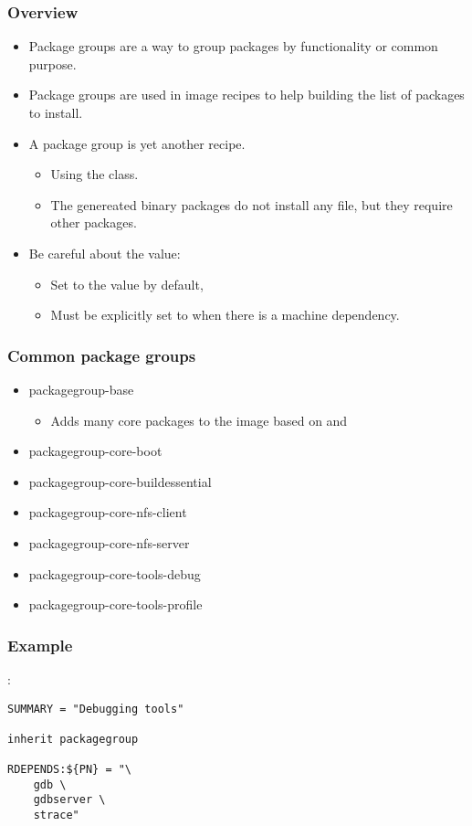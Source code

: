\begin{frame}
  \frametitle{Overview}
  \begin{itemize}
    \item Package groups are a way to group packages by functionality or
      common purpose.
    \item Package groups are used in image recipes to help building
      the list of packages to install.
    \item A package group is yet another recipe.
      \begin{itemize}
        \item Using the  class.
        \item The genereated binary packages do not install any file, but
          they require other packages.
      \end{itemize}
    \item Be careful about the  value:
      \begin{itemize}
      \item Set to the value  by default,
      \item Must be explicitly set to  when there is a machine
        dependency.
      \end{itemize}
  \end{itemize}
\end{frame}

\begin{frame}
  \frametitle{Common package groups}
  \begin{itemize}
    \item packagegroup-base
      \begin{itemize}
        \item Adds many core packages to the image based on
           and 
      \end{itemize}
    \item packagegroup-core-boot
    \item packagegroup-core-buildessential
    \item packagegroup-core-nfs-client
    \item packagegroup-core-nfs-server
    \item packagegroup-core-tools-debug
    \item packagegroup-core-tools-profile
  \end{itemize}
\end{frame}

\begin{frame}[fragile]
  \frametitle{Example}
  :
  \begin{block}{}
    \begin{verbatim}
SUMMARY = "Debugging tools"

inherit packagegroup

RDEPENDS:${PN} = "\
    gdb \
    gdbserver \
    strace"
    \end{verbatim}
  \end{block}
\end{frame}
